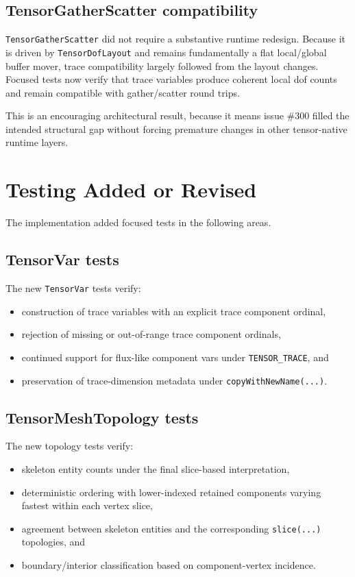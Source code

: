 \documentclass[11pt]{article}
\begin{document}
\subsection{TensorGatherScatter compatibility}

\texttt{TensorGatherScatter} did not require a substantive runtime redesign. Because it is driven by \texttt{TensorDofLayout} and remains fundamentally a flat local/global buffer mover, trace compatibility largely followed from the layout changes. Focused tests now verify that trace variables produce coherent local dof counts and remain compatible with gather/scatter round trips.

This is an encouraging architectural result, because it means issue \#300 filled the intended structural gap without forcing premature changes in other tensor-native runtime layers.

\section{Testing Added or Revised}

The implementation added focused tests in the following areas.

\subsection{TensorVar tests}

The new \texttt{TensorVar} tests verify:
\begin{itemize}[leftmargin=2em]
  \item construction of trace variables with an explicit trace component ordinal,
  \item rejection of missing or out-of-range trace component ordinals,
  \item continued support for flux-like component vars under \texttt{TENSOR\_TRACE}, and
  \item preservation of trace-dimension metadata under \texttt{copyWithNewName(...)}.
\end{itemize}

\subsection{TensorMeshTopology tests}

The new topology tests verify:
\begin{itemize}[leftmargin=2em]
  \item skeleton entity counts under the final slice-based interpretation,
  \item deterministic ordering with lower-indexed retained components varying fastest within each vertex slice,
  \item agreement between skeleton entities and the corresponding \texttt{slice(...)} topologies, and
  \item boundary/interior classification based on component-vertex incidence.
\end{itemize}
\end{document}
